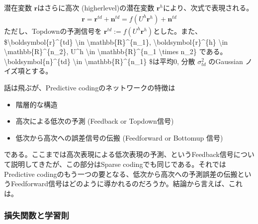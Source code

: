 \documentclass[letterpaper,10pt,english]{sphinxmanual}
\begin{document}
潜在変数 \(\boldsymbol{r}\)はさらに高次 (higher\sphinxhyphen{}level)の潜在変数 \(\boldsymbol{r}^h\)により、次式で表現される。
\begin{equation*}
\begin{split}
\boldsymbol{r} = \boldsymbol{r}^{td}+\boldsymbol{n}^{td}=f(U^h \boldsymbol{r}^h)+\boldsymbol{n}^{td} \tag{2}
\end{split}
\end{equation*}
ただし、Top\sphinxhyphen{}downの予測信号を \(\boldsymbol{r}^{td}:=f(U^h \boldsymbol{r}^h)\)とした。また、\$\textbackslash{}boldsymbol\{r\}\textasciicircum{}\{td\} \textbackslash{}in \textbackslash{}mathbb\{R\}\textasciicircum{}\{n\_1\}, \textbackslash{}boldsymbol\{r\}\textasciicircum{}\{h\} \textbackslash{}in \textbackslash{}mathbb\{R\}\textasciicircum{}\{n\_2\}, U\textasciicircum{}h \textbackslash{}in \textbackslash{}mathbb\{R\}\textasciicircum{}\{n\_1 \textbackslash{}times n\_2\} \(である。\)\textbackslash{}boldsymbol\{n\}\textasciicircum{}\{td\} \textbackslash{}in \textbackslash{}mathbb\{R\}\textasciicircum{}\{n\_1\} \$は平均0, 分散 \(\sigma_{td}^2\) のGaussian ノイズ項とする。

話は飛ぶが、Predictive codingのネットワークの特徴は
\begin{itemize}
\item {} 
階層的な構造

\item {} 
高次による低次の予測 (Feedback or Top\sphinxhyphen{}down信号)

\item {} 
低次から高次への誤差信号の伝搬 (Feedforward or Bottom\sphinxhyphen{}up 信号)

\end{itemize}

である。ここまでは高次表現による低次表現の予測、というFeedback信号について説明してきたが、この部分はSparse codingでも同じである。それではPredictive codingのもう一つの要となる、低次から高次への予測誤差の伝搬というFeedforward信号はどのように導かれるのだろうか。結論から言えば、これは。


\subsubsection{損失関数と学習則}
\label{\detokenize{11-3_predictive-coding-rao:id2}}
\end{document}
